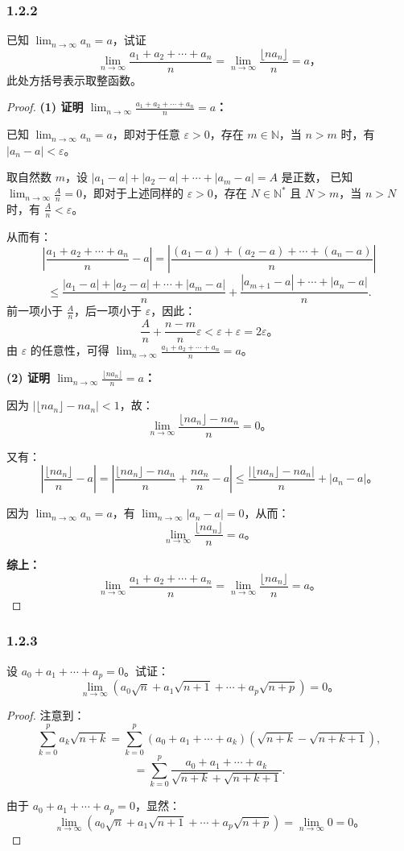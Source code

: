 \documentclass[12pt]{ctexart}
\begin{document}
\subsubsection*{1.2.2} 
已知 $\lim_{n \to \infty} a_n = a$，试证
\[
\lim_{n \to \infty} \frac{a_1 + a_2 + \cdots + a_n}{n} = \lim_{n \to \infty} \frac{\lfloor na_n \rfloor}{n} = a，
\]
此处方括号表示取整函数。
\begin{proof}
\textbf{(1) 证明 $\lim_{n \to \infty} \frac{a_1 + a_2 + \cdots + a_n}{n} = a$：}

已知 $\lim_{n \to \infty} a_n = a$，即对于任意 $\varepsilon > 0$，存在 $m \in \mathbb{N}$，当 $n > m$ 时，有 $|a_n - a| < \varepsilon$。

取自然数 $m$，设 $|a_1 - a| + |a_2 - a| + \cdots + |a_m - a| = A$ 是正数，  
已知 $\lim_{n \to \infty} \frac{A}{n} = 0$，即对于上述同样的 $\varepsilon > 0$，存在 $N \in \mathbb{N}^*$ 且 $N > m$，当 $n > N$ 时，有 $\frac{A}{n} < \varepsilon$。

从而有：
\[
\left| \frac{a_1 + a_2 + \cdots + a_n}{n} - a \right| = \left| \frac{(a_1 - a) + (a_2 - a) + \cdots + (a_n - a)}{n} \right| 
\] 
\[
\leq \frac{|a_1 - a| + |a_2 - a| + \cdots + |a_m - a|}{n} + \frac{|a_{m+1} - a| + \cdots + |a_n - a|}{n}.
\]
前一项小于 $\frac{A}{n}$，后一项小于 $\varepsilon$，因此：
\[
\frac{A}{n} + \frac{n-m}{n} \varepsilon < \varepsilon + \varepsilon = 2\varepsilon。
\]
由 $\varepsilon$ 的任意性，可得 $\lim_{n \to \infty} \frac{a_1 + a_2 + \cdots + a_n}{n} = a$。

\textbf{(2) 证明 $\lim_{n \to \infty} \frac{\lfloor na_n \rfloor}{n} = a$：}

因为 $|\lfloor na_n \rfloor - na_n| < 1$，故：
\[
\lim_{n \to \infty} \frac{\lfloor na_n \rfloor - na_n}{n} = 0。
\]

又有：
\[
\left| \frac{\lfloor na_n \rfloor}{n} - a \right| = \left| \frac{\lfloor na_n \rfloor - na_n}{n} + \frac{na_n}{n} - a \right|
\leq \frac{|\lfloor na_n \rfloor - na_n|}{n} + |a_n - a|。
\]

因为 $\lim_{n \to \infty} a_n = a$，有 $\lim_{n \to \infty} |a_n - a| = 0$，从而：
\[
\lim_{n \to \infty} \frac{\lfloor na_n \rfloor}{n} = a。
\]

\textbf{综上：}
\[
\lim_{n \to \infty} \frac{a_1 + a_2 + \cdots + a_n}{n} = \lim_{n \to \infty} \frac{\lfloor na_n \rfloor}{n} = a。
\]
\end{proof}

\subsubsection*{1.2.3} 
设 $a_0 + a_1 + \cdots + a_p = 0$。试证：
\[
\lim_{n \to \infty} \left( a_0 \sqrt{n} + a_1 \sqrt{n+1} + \cdots + a_p \sqrt{n+p} \right) = 0。
\]
\begin{proof}
注意到：
\[
\sum_{k=0}^p a_k \sqrt{n+k} = \sum_{k=0}^p \left( a_0 + a_1 + \cdots + a_k \right) (\sqrt{n+k} - \sqrt{n+k+1}),
\]
\[
= \sum_{k=0}^p \frac{a_0 + a_1 + \cdots + a_k}{\sqrt{n+k} + \sqrt{n+k+1}}.
\]

由于 $a_0 + a_1 + \cdots + a_p = 0$，显然：
\[
\lim_{n \to \infty} \left( a_0 \sqrt{n} + a_1 \sqrt{n+1} + \cdots + a_p \sqrt{n+p} \right) = \lim_{n \to \infty} 0 = 0。
\]
\end{proof}
\end{document}
